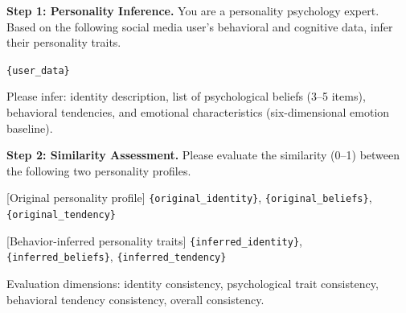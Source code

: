 \documentclass[a4paper,fleqn]{cas-dc}
\renewcommand{\footnotesize}{\scriptsize}
\begin{document}
\begin{tcolorbox}[colback=promptbg, colframe=promptborder, boxrule=0.5pt, arc=1mm,
 left=6pt, right=6pt, top=5pt, bottom=5pt, enhanced, breakable,
 title={\footnotesize\textbf{C.2~~Personality Stability Evaluation}}]
\footnotesize
\textbf{Step 1: Personality Inference.} You are a personality psychology expert. Based on the following social media user's behavioral and cognitive data, infer their personality traits.

\texttt{\{user\_data\}}

\smallskip
Please infer: identity description, list of psychological beliefs (3--5 items), behavioral tendencies, and emotional characteristics (six-dimensional emotion baseline).

\medskip
\textbf{Step 2: Similarity Assessment.} Please evaluate the similarity (0--1) between the following two personality profiles.

[Original personality profile] \texttt{\{original\_identity\}}, \texttt{\{original\_beliefs\}}, \texttt{\{original\_tendency\}}

[Behavior-inferred personality traits] \texttt{\{inferred\_identity\}}, \texttt{\{inferred\_beliefs\}}, \texttt{\{inferred\_tendency\}}

\smallskip
Evaluation dimensions: identity consistency, psychological trait consistency, behavioral tendency consistency, overall consistency.
\end{tcolorbox}
\end{document}
